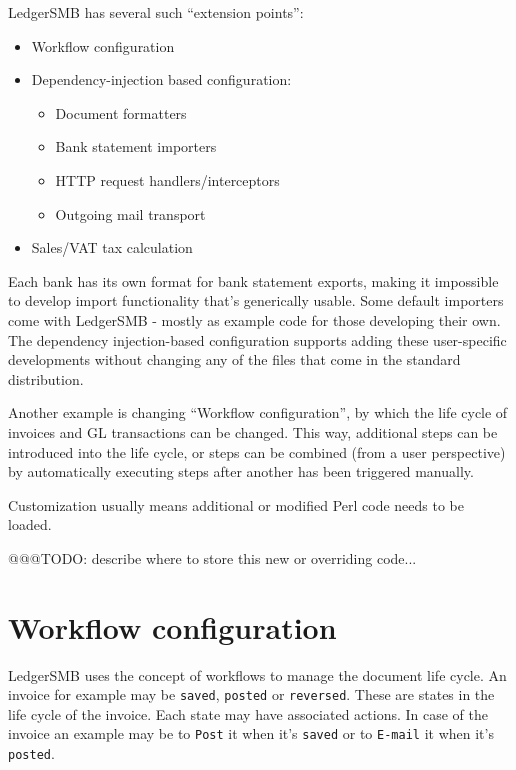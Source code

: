 LedgerSMB has several such ``extension points'':

\begin{itemize}
	\item Workflow configuration
	\item Dependency-injection based configuration:
		\begin{itemize}
			\item Document formatters
			\item Bank statement importers
			\item HTTP request handlers/interceptors
			\item Outgoing mail transport
		\end{itemize}
	\item Sales/VAT tax calculation
\end{itemize}

Each bank has its own format for bank statement exports, making it impossible to develop import functionality that's generically usable.  Some default importers come with LedgerSMB - mostly as example code for those developing their own.  The dependency injection-based configuration supports adding these user-specific developments without changing any of the files that come in the standard distribution.

Another example is changing ``Workflow configuration'', by which the life cycle of invoices and GL transactions can be changed.  This way, additional steps can be introduced into the life cycle, or steps can be combined (from a user perspective) by automatically executing steps after another has been triggered manually.

Customization usually means additional or modified Perl code needs to be loaded. 

@@@TODO: describe where to store this new or overriding code...

\section{Workflow configuration}

LedgerSMB uses the concept of workflows to manage the document life cycle.
An invoice for example may be \texttt{saved}, \texttt{posted} or \texttt{reversed}.  These
are states in the life cycle of the invoice.  Each state may have associated actions.  In
case of the invoice an example may be to \texttt{Post} it when it's \texttt{saved} or to
\texttt{E-mail} it when it's \texttt{posted}.

